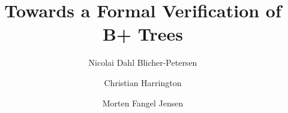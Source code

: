 \documentclass[oribibl]{llncs}
\begin{document}
\mainmatter
\title{Towards a Formal Verification of B+ Trees}
\author{Nicolai Dahl Blicher-Petersen \and Christian Harrington \and Morten Fangel Jensen \\
}

\maketitle




\newpage


\end{document}
